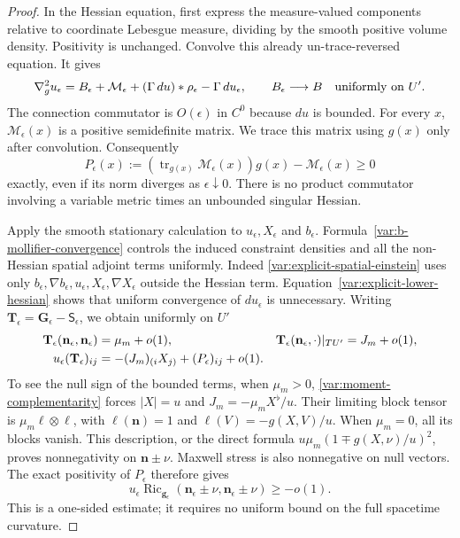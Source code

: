 \begin{proof}
In the Hessian equation, first express the measure-valued components
relative to coordinate Lebesgue measure, dividing by the smooth
positive volume density.  Positivity is unchanged.  Convolve this
already un-trace-reversed equation.  It gives
\begin{equation}\label{var:Hessian-mollifier}
 \nabla_g^2u_\epsilon
 =B_\epsilon+\mathcal M_\epsilon+
        (\Gamma\,du)*\rho_\epsilon-\Gamma\,du_\epsilon,
 \qquad B_\epsilon\longrightarrow B\quad\hbox{uniformly on }U'.
\end{equation}
The connection commutator is $O(\epsilon)$ in $C^0$ because $du$ is
bounded.  For every $x$, $\mathcal M_\epsilon(x)$ is a positive
semidefinite matrix.  We trace this matrix using $g(x)$ only after
convolution.  Consequently
\begin{equation}\label{var:exact-PSD-reversal}
 P_\epsilon(x):=
       (\operatorname{tr}_{g(x)}\mathcal M_\epsilon(x))g(x)
                        -\mathcal M_\epsilon(x)\geq0
\end{equation}
exactly, even if its norm diverges as $\epsilon\downarrow0$.
There is no product commutator involving a variable metric times an
unbounded singular Hessian.

Apply the smooth stationary calculation to $u_\epsilon,X_\epsilon$
and $b_\epsilon$.  Formula~\eqref{var:b-mollifier-convergence} controls
the induced constraint densities and all the non-Hessian spatial
adjoint terms uniformly.  Indeed \eqref{var:explicit-spatial-einstein} uses only
$b_\epsilon,\nabla b_\epsilon,u_\epsilon,X_\epsilon,
\nabla X_\epsilon$ outside the Hessian term.
Equation~\eqref{var:explicit-lower-hessian} shows that
uniform convergence of $du_\epsilon$ is unnecessary.
Writing $\mathbf T_\epsilon=\mathbf G_\epsilon-\mathsf S_\epsilon$,
we obtain uniformly on $U'$
\begin{align}\label{var:smoothed-stress-blocks}
 \mathbf T_\epsilon(\mathbf n_\epsilon,\mathbf n_\epsilon)
     &=\mu_m+o(1),&
 \mathbf T_\epsilon(\mathbf n_\epsilon,\cdot)|_{TU'}
     &=J_m+o(1),\\
 u_\epsilon(\mathbf T_\epsilon)_{ij}
     &=-(J_m)_{(i}X_{j)}+(P_\epsilon)_{ij}+o(1).&&
 \notag
\end{align}
To see the null sign of the bounded terms, when $\mu_m>0$,
\eqref{var:moment-complementarity} forces
$|X|=u$ and $J_m=-\mu_m X^\flat/u$.  Their limiting block tensor is
$\mu_m\ell\otimes\ell$, with
$\ell(\mathbf n)=1$ and $\ell(V)=-g(X,V)/u$.
When $\mu_m=0$, all its blocks vanish.  This description, or the
direct formula $u\mu_m(1\mp g(X,\nu)/u)^2$, proves nonnegativity on
$\mathbf n\pm\nu$.  Maxwell stress is also nonnegative on null
vectors.  The exact positivity of $P_\epsilon$ therefore gives
\begin{equation}\label{var:mollified-null-Ricci}
 u_\epsilon\operatorname{Ric}_{\mathbf g_\epsilon}
       (\mathbf n_\epsilon\pm\nu,
        \mathbf n_\epsilon\pm\nu)\geq-o(1).
\end{equation}
This is a one-sided estimate; it requires no uniform bound on the full
spacetime curvature.


\end{proof}
